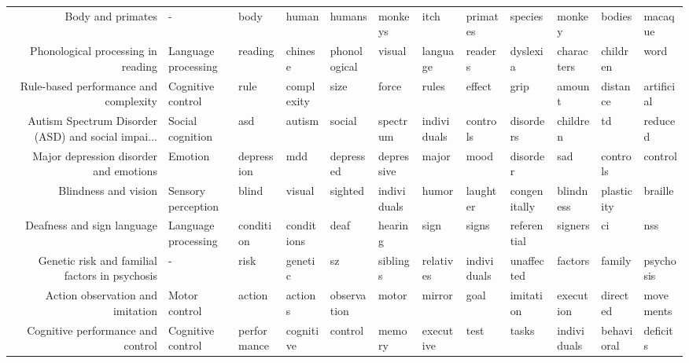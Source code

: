 \documentclass[english]{article}
\begin{document}
\begin{landscape}
\begin{supertabular}{rlllllllllll}
                   Body and primates &                   - &             body &         human &          humans &        monkeys &        itch &       primates &       species &         monkey &        bodies &        macaque \\
  Phonological processing in reading & Language processing &          reading &       chinese &    phonological &         visual &    language &        readers &      dyslexia &     characters &      children &           word \\
Rule-based performance and complexity &   Cognitive control &             rule &    complexity &            size &          force &       rules &         effect &          grip &         amount &      distance &     artificial \\
Autism Spectrum Disorder (ASD) and social impai... &    Social cognition &              asd &        autism &          social &       spectrum & individuals &       controls &     disorders &       children &            td &        reduced \\
Major depression disorder and emotions &             Emotion &       depression &           mdd &       depressed &     depressive &       major &           mood &      disorder &            sad &      controls &        control \\
                Blindness and vision &  Sensory perception &            blind &        visual &         sighted &    individuals &       humor &       laughter &  congenitally &      blindness &    plasticity &        braille \\
          Deafness and sign language & Language processing &        condition &    conditions &            deaf &        hearing &        sign &          signs &   referential &        signers &            ci &            nss \\
Genetic risk and familial factors in psychosis &                   - &             risk &       genetic &              sz &       siblings &   relatives &    individuals &    unaffected &        factors &        family &      psychosis \\
    Action observation and imitation &       Motor control &           action &       actions &     observation &          motor &      mirror &           goal &     imitation &      execution &      directed &      movements \\
   Cognitive performance and control &   Cognitive control &      performance &     cognitive &         control &         memory &   executive &           test &         tasks &    individuals &    behavioral &       deficits \\

\end{supertabular}
\end{landscape}
\end{document}

